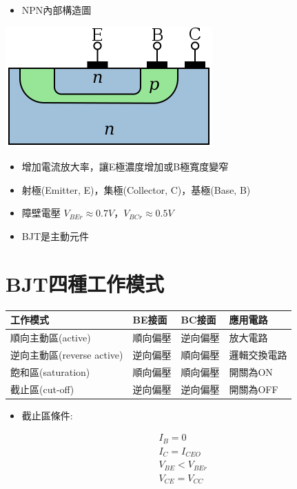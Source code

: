 \documentclass[
]{report}
\providecommand{\tightlist}{%
  \setlength{\itemsep}{0pt}\setlength{\parskip}{0pt}}
\begin{document}
\begin{itemize}
\tightlist
\item
  NPN內部構造圖
\end{itemize}

\includegraphics{NPN.png}

\begin{itemize}
\tightlist
\item
  增加電流放大率，讓E極濃度增加或B極寬度變窄
\item
  射極(Emitter, E)，集極(Collector, C)，基極(Base, B)
\item
  障壁電壓 \(V_{BEr} \approx 0.7V\)，\(V_{BCr} \approx 0.5V\)
\item
  BJT是主動元件
\end{itemize}

\hypertarget{bjtux56dbux7a2eux5de5ux4f5cux6a21ux5f0f}{%
\section{BJT四種工作模式}\label{bjtux56dbux7a2eux5de5ux4f5cux6a21ux5f0f}}

\begin{longtable}[]{@{}llll@{}}
\toprule()
工作模式 & BE接面 & BC接面 & 應用電路 \\
\midrule()
\endhead
順向主動區(active) & 順向偏壓 & 逆向偏壓 & 放大電路 \\
逆向主動區(reverse active) & 逆向偏壓 & 順向偏壓 & 邏輯交換電路 \\
飽和區(saturation) & 順向偏壓 & 順向偏壓 & 開關為ON \\
截止區(cut-off) & 逆向偏壓 & 逆向偏壓 & 開關為OFF \\
\bottomrule()
\end{longtable}

\begin{itemize}
\tightlist
\item
  截止區條件:
\end{itemize}

\begin{equation*}
\begin{split}
& I_B = 0 \\
& I_C = I_{CEO} \\
& V_{BE} < V_{BEr} \\
& V_{CE} = V_{CC}
\end{split}
\end{equation*}
\end{document}

